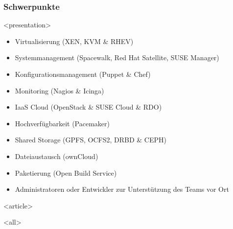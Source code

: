 \begin{frame}[fragile]
\frametitle<presentation>{Schwerpunkte}

 
\mode
<presentation>

\begin{itemize}
\item Virtualisierung (XEN, KVM \& RHEV)
\item Systemmanagement (Spacewalk, Red Hat Satellite, SUSE Manager)
\item Konfigurationsmanagement (Puppet \& Chef)
\item Monitoring (Nagios \& Icinga)
\item IaaS Cloud (OpenStack \& SUSE Cloud \& RDO)
\item Hochverfügbarkeit (Pacemaker)
\item Shared Storage (GPFS, OCFS2, DRBD \& CEPH)
\item Dateiaustausch (ownCloud)
\item Paketierung (Open Build Service)
\item Administratoren oder Entwickler zur Unterstützung des Teams vor Ort
\end{itemize}


\mode
<article>

\mode
<all>

\end{frame}
\newpage

\clearpage

